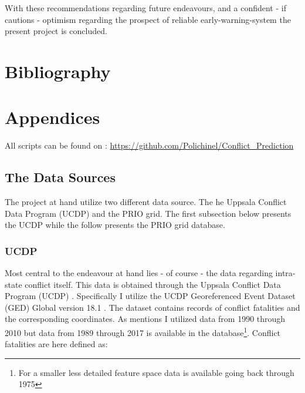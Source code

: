 \documentclass[a4paper]{article}
\begin{document}
With these recommendations regarding future endeavours, and a confident - if cautions - optimism regarding the prospect of reliable early-warning-system the present project is concluded.\par

\pagebreak

\section{Bibliography}
 


\pagebreak
\section{Appendices}

All scripts can be found on : \hyperlink{https://github.com/Polichinel/Conflict_Prediction}{https://github.com/Polichinel/Conflict\_Prediction}


\subsection{The Data Sources}\label{data_sources} %

The project at hand utilize two different data source. The he Uppsala Conflict Data Program (UCDP) \citep{Sundberg_2013, Croicu_Sundberg_2017} and the PRIO grid\citep{Tollefsen_2012}. The first subsection below presents the UCDP while the follow presents the PRIO grid database.\par

\subsubsection{UCDP}

Most central to the endeavour at hand lies - of course - the data regarding intra-state conflict itself. This data is obtained through the Uppsala Conflict Data Program (UCDP) \citep{Sundberg_2013, Croicu_Sundberg_2017}. Specifically I utilize the UCDP Georeferenced Event Dataset (GED) Global version 18.1 \citep{UCDP_2017}. The dataset contains records of conflict fatalities and the corresponding coordinates. As mentions I utilized data from 1990 through 2010 but data from 1989 through 2017 is available in the database\footnote{For a smaller less detailed feature space data is available going back through 1975}. Conflict fatalities are here defined as: 
\end{document}
